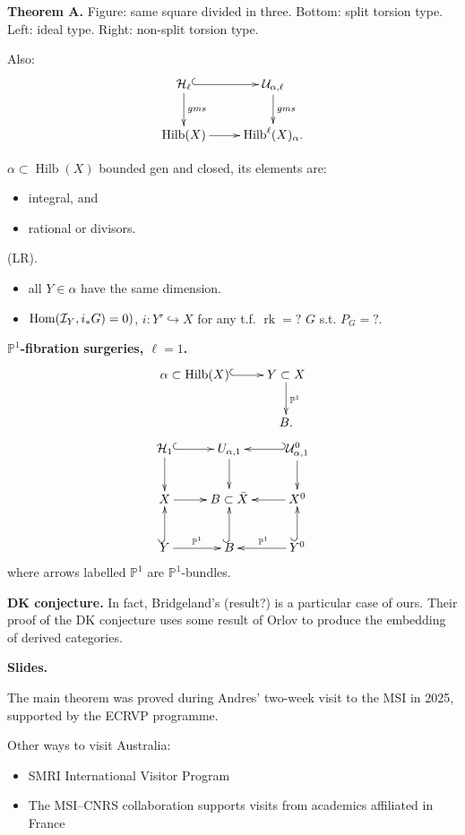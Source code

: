 \medskip\noindent
{\bf Theorem A.}
Figure: same square divided in three.
Bottom: split torsion type. Left: ideal
type. Right: non-split torsion type.

Also:
$$
\xymatrix{
\mathcal{H}_{\ell}
\ar@{^{(}->}[r]\ar[d]^{gms}
& \mathcal{U}_{\alpha,\ell}\ar[d]^{gms}\\
\operatorname{Hilb}(X)\ar[r]
&\operatorname{Hilb}^{\ell}(X)_{\alpha}.
}
$$

$\alpha \subset \operatorname{Hilb}(X)$
bounded gen and closed, its elements are:
\begin{itemize}
\item integral, and
\item rational or divisors.
\end{itemize}

\noindent
(LR).
\begin{itemize}
\item all $Y \in \alpha$ have the same
dimension.

\item $\mathop{\mathrm{Hom}}\nolimits(\mathcal{I}_Y,i_*G)=0)$,
$i:Y' \hookrightarrow X$ for any t.f.
$\operatorname{rk} = ?$ $G$ s.t.
$P_G=?$.
\end{itemize}



\medskip\noindent
{\bf $\mathbb{P}^1$-fibration
surgeries, $\ell=1$.}
$$
\xymatrix{
\alpha \subset \operatorname{Hilb}(X)
\ar@{^{(}->}[r]&
Y\subset X\ar[d]^{\mathbb{P}^1}\\
& B.
}
$$
$$
\xymatrix{
\mathcal{H}_1 \ar@{^{(}->}[r]\ar[d]
& U_{\alpha,1}\ar[d]
& \mathcal{U}_{\alpha,1}^0
\ar[d]\ar@{_{(}->}[l]\\
X \ar[r]& B \subset \bar{X}
&X^0 \ar[l]\\
Y \ar@{^{(}->}[u]\ar[r]^{\mathbb{P}^1}
&B \ar@{^{(}->}[u]
&Y^0\ar@{^{(}->}[u]\ar[l]_{\mathbb{P}^1}
}
$$
where arrows labelled $\mathbb{P}^1$
are $\mathbb{P}^1$-bundles.

\medskip\noindent
{\bf DK conjecture.}
In fact, Bridgeland's (result?)
is a particular case of ours.
Their proof of the DK conjecture uses
some result of Orlov to produce the
embedding of derived categories.








\medskip\noindent
{\bf Slides.}

The main theorem was proved during
Andres' two-week visit to the MSI in
2025, supported by the ECRVP
programme.

Other ways to visit Australia:
\begin{itemize}
\item SMRI International Visitor Program

\item The MSI--CNRS collaboration
supports visits from academics
affiliated in France
\end{itemize}

